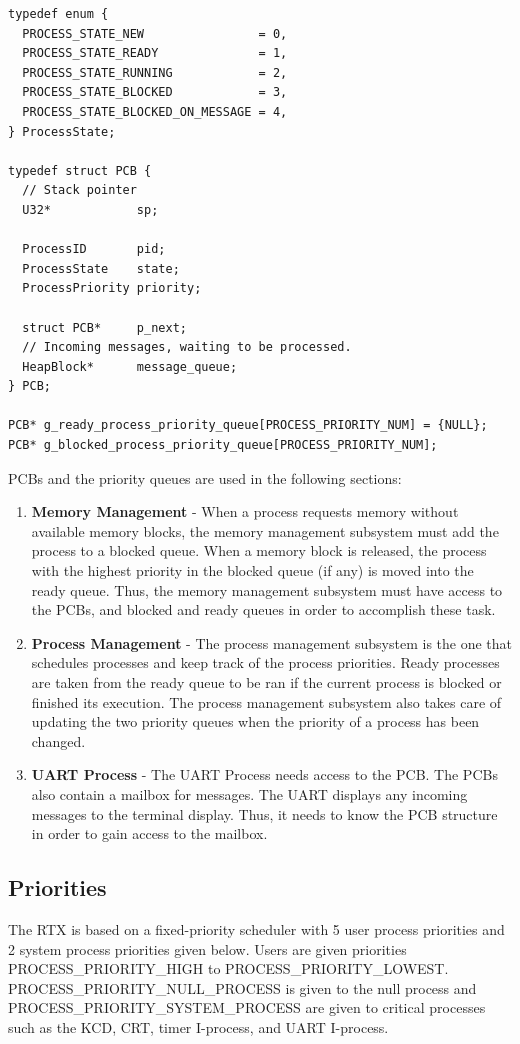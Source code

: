 \documentclass[12pt,twocolumn]{report}
\begin{document}
\begin{lstlisting}
typedef enum {
  PROCESS_STATE_NEW                = 0,
  PROCESS_STATE_READY              = 1,
  PROCESS_STATE_RUNNING            = 2,
  PROCESS_STATE_BLOCKED            = 3,
  PROCESS_STATE_BLOCKED_ON_MESSAGE = 4,
} ProcessState;

typedef struct PCB {
  // Stack pointer
  U32*            sp;

  ProcessID       pid;
  ProcessState    state;
  ProcessPriority priority;

  struct PCB*     p_next;
  // Incoming messages, waiting to be processed.
  HeapBlock*      message_queue;
} PCB;

PCB* g_ready_process_priority_queue[PROCESS_PRIORITY_NUM] = {NULL};
PCB* g_blocked_process_priority_queue[PROCESS_PRIORITY_NUM];
\end{lstlisting}

PCBs and the priority queues are used in the following sections:
\begin{enumerate}
    \item {\bf Memory Management} - When a process requests memory without available memory blocks, the memory management subsystem must add the process to a blocked queue. When a memory block is released, the process with the highest priority in the blocked queue (if any) is moved into the ready queue. Thus, the memory management subsystem must have access to the PCBs, and blocked and ready queues in order to accomplish these task.
    \item {\bf Process Management} - The process management subsystem is the one that schedules processes and keep track of the process priorities. Ready processes are taken from the ready queue to be ran if the current process is blocked or finished its execution. The process management subsystem also takes care of updating the two priority queues when the priority of a process has been changed.
    \item {\bf UART Process} - The UART Process needs access to the PCB. The PCBs also contain a mailbox for messages. The UART displays any incoming messages to the terminal display. Thus, it needs to know the PCB structure in order to gain access to the mailbox.
\end{enumerate}

\subsection{Priorities}
The RTX is based on a fixed-priority scheduler with 5 user process priorities and 2 system process priorities given below. Users are given priorities PROCESS\_PRIORITY\_HIGH to PROCESS\_PRIORITY\_LOWEST. PROCESS\_PRIORITY\_NULL\_PROCESS is given to the null process and PROCESS\_PRIORITY\_SYSTEM\_PROCESS are given to critical processes such as the KCD, CRT, timer I-process, and UART I-process.
\end{document}
